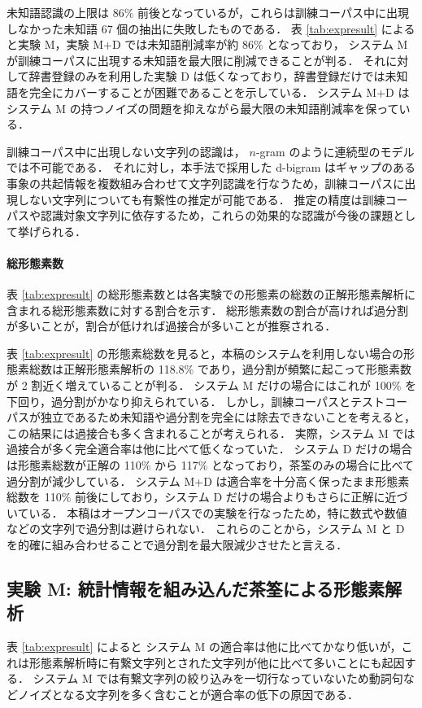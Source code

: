 未知語認識の上限は 86\% 前後となっているが，これらは訓練コーパス中に出現しなかった未知語 67 個の抽出に失敗したものである．
表 \ref{tab:expresult} によると実験 M，実験 M+D では未知語削減率が約 86\% となっており，
システム M が訓練コーパスに出現する未知語を最大限に削減できることが判る．
それに対して辞書登録のみを利用した実験 D は低くなっており，辞書登録だけでは未知語を完全にカバーすることが困難であることを示している．
システム M+D はシステム M の持つノイズの問題を抑えながら最大限の未知語削減率を保っている．

訓練コーパス中に出現しない文字列の認識は， $n$-gram のように連続型のモデルでは不可能である．
それに対し，本手法で採用した d-bigram はギャップのある事象の共起情報を複数組み合わせて文字列認識を行なうため，訓練コーパスに出現しない文字列についても有繋性の推定が可能である\cite{nobesawa98ipsjnl}．
推定の精度は訓練コーパスや認識対象文字列に依存するため，これらの効果的な認識が今後の課題として挙げられる．
\paragraph{総形態素数}
\label{sec:expresultmorph}
表 \ref{tab:expresult} の総形態素数とは各実験での形態素の総数の正解形態素解析に含まれる総形態素数に対する割合を示す．
総形態素数の割合が高ければ過分割が多いことが，割合が低ければ過接合が多いことが推察される．

表 \ref{tab:expresult} の形態素総数を見ると，本稿のシステムを利用しない場合の形態素総数は正解形態素解析の 118.8\% であり，過分割が頻繁に起こって形態素数が 2 割近く増えていることが判る．
システム M だけの場合にはこれが 100\% を下回り，過分割がかなり抑えられている．
しかし，訓練コーパスとテストコーパスが独立であるため未知語や過分割を完全には除去できないことを考えると，この結果には過接合も多く含まれることが考えられる．
実際，システム M では過接合が多く完全適合率は他に比べて低くなっていた．
システム D だけの場合は形態素総数が正解の 110\% から 117\% となっており，茶筌のみの場合に比べて過分割が減少している．
システム M+D は適合率を十分高く保ったまま形態素総数を 110\% 前後にしており，システム D だけの場合よりもさらに正解に近づいている．
本稿はオープンコーパスでの実験を行なったため，特に数式や数値などの文字列で過分割は避けられない．
これらのことから，システム M と D を的確に組み合わせることで過分割を最大限減少させたと言える．
\subsection{実験 M: 統計情報を組み込んだ茶筌による形態素解析}
\label{sec:resultsystemm}
表 \ref{tab:expresult} によると
システム M の適合率は他に比べてかなり低いが，これは形態素解析時に有繋文字列とされた文字列が他に比べて多いことにも起因する．
システム M では有繋文字列の絞り込みを一切行なっていないため動詞句などノイズとなる文字列を多く含むことが適合率の低下の原因である．

